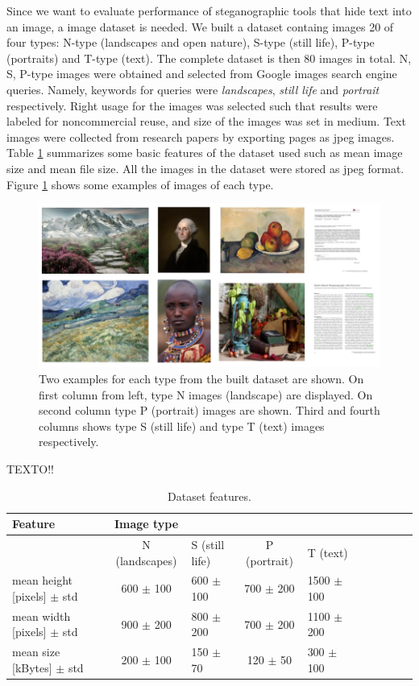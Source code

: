 \documentclass[11pt]{article}
\begin{document}
Since we want to evaluate performance of steganographic tools that hide text into an image, a image dataset is needed.
We built a dataset containg images 20 of four types: N-type (landscapes and open nature), S-type (still life), P-type (portraits) and
T-type (text). The complete dataset is then 80 images in total. N, S, P-type images were obtained and selected from Google images search engine queries.
Namely, keywords for queries were \textit{landscapes}, \textit{still life} and \textit{portrait} respectively.
Right usage for the images was selected such that results were labeled for noncommercial reuse, and size of the images was set in 
medium. Text images were collected from research papers by exporting pages as jpeg images.
Table \ref{Tab:Features} summarizes some basic features of the dataset used such as mean image size and mean file size. All the
images in the dataset were stored as jpeg format. Figure \ref{Fig:Dataset_example} shows some examples of images of each type.

\begin{figure}[h]
\centering
\includegraphics[scale=0.5]{Dataset_example.jpeg}
\caption{Two examples for each type from the built dataset are shown. On first column from left, type N images (landscape) are displayed.
On second column type P (portrait) images are shown. Third and fourth columns shows type S (still life) and type T (text) images respectively. }
\label{Fig:Dataset_example}
\end{figure}

TEXTO!!

\begin{table}[!h] 
\caption{Dataset features.}
\label{Tab:Features}
\begin{tabular}{lclclclclc}
\hline
\hline 
Feature &  Image type\\
\hline
\midrule
{}       & N (landscapes)   & S (still life)    & P (portrait)   & T (text)\\
mean height [pixels] $\pm$ std  &  600 $\pm$ 100 & 600 $\pm$ 100   & 700 $\pm$ 200  & 1500 $\pm$ 100 \\
mean width [pixels] $\pm$ std   &  900 $\pm$ 200 & 800 $\pm$ 200   & 700 $\pm$ 200  &  1100 $\pm $200 \\
mean size [kBytes] $\pm$ std    &  200 $\pm$ 100 & 150 $\pm$ 70    & 120 $\pm$ 50   &  300 $\pm$ 100\\
\hline
\end{tabular}
\end{table}
\end{document}
